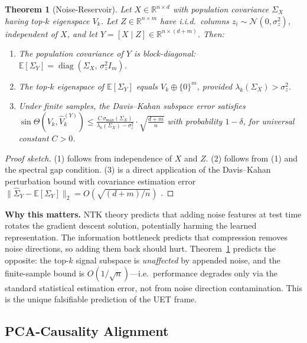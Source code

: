 \documentclass[10pt]{article}
\newcommand{\sinT}{\sin\Theta}
\theoremstyle{plain}
\newtheorem{theorem}{Theorem}
\theoremstyle{definition}
\theoremstyle{remark}
\begin{document}
\begin{theorem}[Noise-Reservoir]\label{thm:noise-reservoir}
Let $X \in \mathbb{R}^{n \times d}$ with population covariance $\Sigma_X$
having top-$k$ eigenspace $V_k$.
Let $Z \in \mathbb{R}^{n \times m}$ have i.i.d.\ columns $z_i \sim
\mathcal{N}(0, \sigma^2_z)$, independent of $X$, and let
$Y = [X \mid Z] \in \mathbb{R}^{n \times (d+m)}$.
Then:
\begin{enumerate}[leftmargin=1.8em,itemsep=2pt]
  \item The population covariance of $Y$ is block-diagonal:
        $\mathbb{E}[\Sigma_Y] = \operatorname{diag}(\Sigma_X,\, \sigma^2_z I_m)$.
  \item The top-$k$ eigenspace of $\mathbb{E}[\Sigma_Y]$ equals
        $V_k \oplus \{0\}^m$, provided
        $\lambda_k(\Sigma_X) > \sigma^2_z$.
  \item Under finite samples, the Davis--Kahan \citep{davis1970rotation}
        subspace error satisfies
        $\sinT(V_k, \hat V_k^{(Y)}) \leq
         \frac{C\,\sigma_{\max}(\Sigma_X)}{\lambda_k(\Sigma_X) - \sigma^2_z}
         \cdot \sqrt{\frac{d+m}{n}}$
        with probability $1 - \delta$, for universal constant $C > 0$.
\end{enumerate}
\end{theorem}

\begin{proof}[Proof sketch]
(1) follows from independence of $X$ and $Z$.
(2) follows from (1) and the spectral gap condition.
(3) is a direct application of the Davis--Kahan perturbation bound with
    covariance estimation error $\|\hat\Sigma_Y - \mathbb{E}[\Sigma_Y]\|_2 =
    O(\sqrt{(d+m)/n})$ \citep{nadler2009finite}.
\end{proof}

\textbf{Why this matters.}
NTK theory \citep{jacot2018ntk} predicts that adding noise features at test
time rotates the gradient descent solution, potentially harming the learned
representation.
The information bottleneck \citep{tishby2015deep} predicts that compression
removes noise directions, so adding them back should hurt.
Theorem~\ref{thm:noise-reservoir} predicts the opposite: the top-$k$ signal
subspace is \emph{unaffected} by appended noise, and the finite-sample bound
is $O(1/\sqrt{n})$---i.e.\ performance degrades only via the standard
statistical estimation error, not from noise direction contamination.
This is the unique falsifiable prediction of the UET frame.

\subsection{PCA-Causality Alignment}
\end{document}
